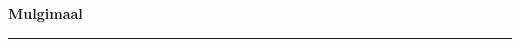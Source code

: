 \documentclass[10pt]{book}
\begin{document}
{
  \samepage
  \raggedbottom
  \raggedright
  \sloppy


  \vspace{0.2in}

  \noindent\begin{minipage}{.1\textwidth}
    \hfill\vspace{0.1in}
  \end{minipage}%
  \noindent\begin{minipage}{.8\textwidth}
    \centering
    \bfseries
    \large Mulgimaal
  \end{minipage}%
  \noindent\begin{minipage}{.1\textwidth}
      \hfill\vspace{0.1in}
  \end{minipage}

  \nopagebreak[4]
  \vspace{0.1in}
  \nopagebreak[4]
  \hrule height 0.05ex
  \nopagebreak[4]
  \vspace{-0.05in}




}
\end{document}
